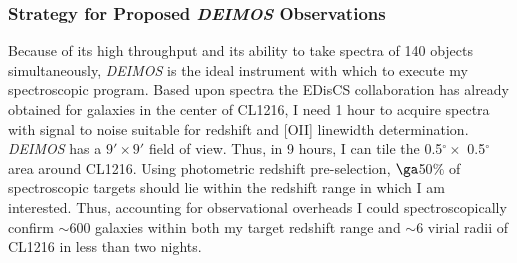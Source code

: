 \documentclass[12pt]{plan}
\begin{document}
\subsubsection*{Strategy for Proposed {\em DEIMOS} Observations}

\vspace{-2mm}

Because of its high throughput and its ability to take spectra of 140
objects simultaneously, {\em DEIMOS} is the ideal instrument with which to execute my spectroscopic program.  Based upon spectra the EDisCS collaboration has
already obtained for galaxies in the center of CL1216, I need 1 hour
to acquire spectra with signal to noise suitable for redshift and
[OII] linewidth determination.  {\em DEIMOS} has a $9' \times 9'$
field of view.  Thus, in 9 hours, I can tile the 0.5$^\circ \times$
0.5$^\circ$ area around CL1216.  Using photometric redshift
pre-selection, $\ga$50$\%$ of spectroscopic targets should lie within
the redshift range in which I am interested.  Thus, accounting for
observational overheads I could spectroscopically confirm $\sim$600
galaxies within both my target redshift range and $\sim$6 virial
radii of CL1216 in less than two nights.

 
\clearpage
\end{document}
